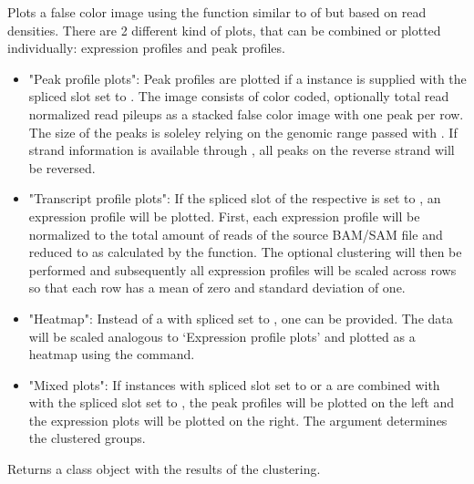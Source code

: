 \documentclass[letterpaper]{book}
\begin{document}
%
\begin{Details}

Plots a false color image using the  function similar to  of  but based on read densities. 
There are 2 different kind of plots, that can be combined or plotted individually: expression profiles and peak profiles. 
\begin{itemize}

\item{} "Peak profile plots": Peak profiles are plotted if a  instance is supplied with the spliced slot set to . The image consists of color coded, optionally total read normalized read pileups as a stacked false color image with one peak per row. The size of the peaks is soleley relying on the genomic range passed with . If strand information is available through , all peaks on the reverse strand will be reversed.
\item{} "Transcript profile plots": If the spliced slot of the respective  is set to , an expression profile will be plotted. First, each expression profile will be normalized to the total amount of reads of the source BAM/SAM file and reduced to  as calculated by the  function. The optional clustering will then be performed and subsequently all expression profiles will be scaled across rows so that each row has a mean of zero and standard deviation of one.
\item{} "Heatmap": Instead of a  with spliced set to , one  can be provided. The data will be scaled analogous to `Expression profile plots' and plotted as a heatmap using the  command.
\item{} "Mixed plots": If  instances with spliced slot set to  or a  are combined with  with the spliced slot set to , the peak profiles will be plotted on the left and the expression plots will be plotted on the right. The  argument determines the clustered groups. 

\end{itemize}

\end{Details}
%
\begin{Value}
Returns a  class object with the results of the clustering.
\end{Value}
\end{document}
